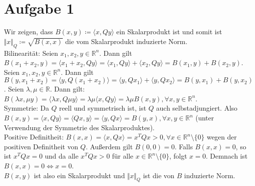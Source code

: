 \documentclass[9pt]{extarticle}
\theoremstyle{named}
\begin{document}
\section*{Aufgabe 1}
Wir zeigen, dass $B(x,y) \coloneqq \langle x, Qy \rangle$ ein Skalarprodukt ist und somit ist $\Vert x \Vert_Q \coloneqq \sqrt{B(x,x)}$ die vom Skalarprodukt induzierte Norm. \\

Bilinearität: Seien $x_1,x_2,y \in \mathbb R^n$. Dann gilt $B(x_1+x_2,y) =  \langle x_1+x_2, Qy \rangle =  \langle x_1, Qy \rangle + \langle x_2, Qy \rangle = B(x_1,y) + B(x_2,y)$. Seien $x_1,x_2,y \in \mathbb R^n$. Dann gilt $B(y,x_1+x_2) =  \langle y, Q(x_1+x_2) \rangle =  \langle y, Qx_1 \rangle + \langle y, Qx_2 \rangle = B(y,x_1) + B(y,x_2)$. Seien $\lambda, \mu \in \mathbb R$. Dann gilt:  $B(\lambda x, \mu y) = \langle \lambda x, Q\mu y \rangle = \lambda \mu \langle x,Qy \rangle = \lambda \mu B(x,y), \forall x,y \in \mathbb R^n$. \\

Symmetrie: Da $Q$ reell und symmetrisch ist, ist $Q$ auch selbstadjungiert. Also $B(x,y) = \langle x,Qy \rangle = \langle Qx, y \rangle = \langle y, Qx \rangle = B(y,x), \forall x,y \in \mathbb R^n$ (unter Verwendung der Symmetrie des Skalarproduktes). \\

Positive Definitheit: $B(x,x) = \langle x, Qx \rangle = x^TQx > 0, \forall x \in \mathbb R^n\setminus \{0\}$ wegen der positiven Definitheit von $Q$. Außerdem gilt $B(0,0) = 0$. Falls $B(x,x) = 0$, so ist $x^TQx = 0$ und da alle $x^TQx > 0$ für alle $x \in \mathbb R^n\setminus \{0\}$, folgt $x = 0$. Demnach ist $B(x,x) = 0 \iff x=0$. \\

$B(x,y)$ ist also ein Skalarprodukt und $\Vert x \Vert_Q$ ist die von $B$ induzierte Norm.
\end{document}
